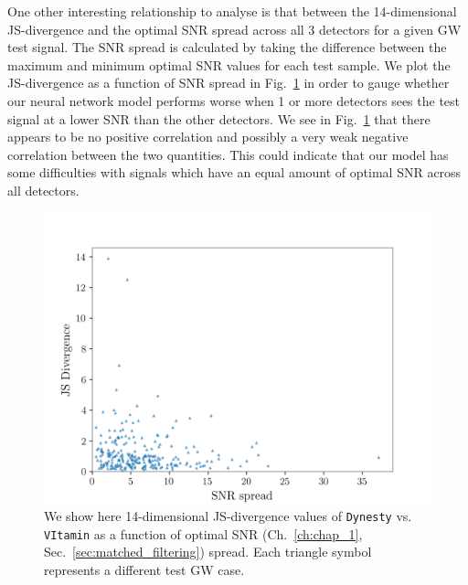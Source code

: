 %
%
One other interesting relationship to analyse is that between the 14-dimensional 
\ac{JS}-divergence and the optimal \ac{SNR} spread across all 3 detectors for a 
given \ac{GW} test signal. The \ac{SNR} spread is calculated by taking the difference 
between the maximum and minimum optimal \ac{SNR} values for each test sample. We plot 
the \ac{JS}-divergence as a function of \ac{SNR} spread in Fig.~\ref{fig:14D_JS_SNR-spread} in order 
to gauge whether our neural network model performs worse when 1 or more detectors 
sees the test signal at a lower \ac{SNR} than the other detectors. We see 
in Fig.~\ref{fig:14D_JS_SNR-spread} that there appears to be no positive correlation 
and possibly a very weak negative correlation between the two quantities. This could 
indicate that our model has some difficulties with signals which have an equal amount 
of optimal \ac{SNR} across all detectors.

\begin{figure}
    \centering
    \includegraphics{figures/JS_vs_SNR-spread.png}
    \caption[14-dimensional JS-divergences of \texttt{Dynesty} vs. \texttt{VItamin} as a function of individual detector optimal SNR spread.]{\label{fig:JS_vs_SNR_dynesty} We show here 14-dimensional 
    \ac{JS}-divergence values of \texttt{Dynesty} vs. \texttt{VItamin} as a function of optimal
    \ac{SNR} (Ch.~\ref{ch:chap_1}, Sec.~\ref{sec:matched_filtering}) spread. Each triangle symbol represents a different test \ac{GW} case.}
    \label{fig:14D_JS_SNR-spread}
\end{figure}


